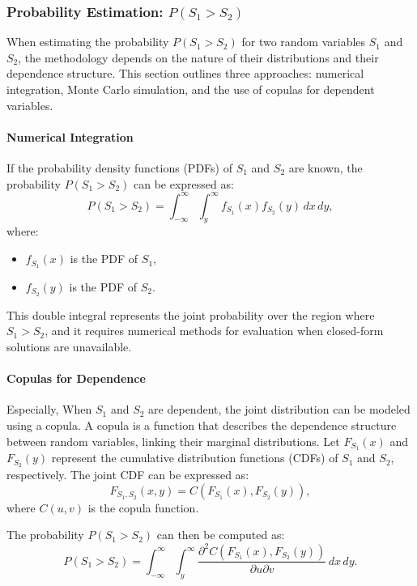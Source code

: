 \subsubsection{Probability Estimation: $P(S_1 > S_2)$}

When estimating the probability $P(S_1 > S_2)$ for two random variables $S_1$ and $S_2$, the methodology depends on the nature of their distributions and their dependence structure. This section outlines three approaches: numerical integration, Monte Carlo simulation, and the use of copulas for dependent variables.

\paragraph{Numerical Integration}

If the probability density functions (PDFs) of $S_1$ and $S_2$ are known, the probability $P(S_1 > S_2)$ can be expressed as:
\begin{equation}
P(S_1 > S_2) = \int_{-\infty}^\infty \int_{y}^\infty f_{S_1}(x) f_{S_2}(y) \, dx \, dy,
\end{equation}
where:
\begin{itemize}
    \item $f_{S_1}(x)$ is the PDF of $S_1$,
    \item $f_{S_2}(y)$ is the PDF of $S_2$.
\end{itemize}

This double integral represents the joint probability over the region where $S_1 > S_2$, and it requires numerical methods for evaluation when closed-form solutions are unavailable.


\paragraph{Copulas for Dependence}

Especially, When $S_1$ and $S_2$ are dependent, the joint distribution can be modeled using a copula. A copula is a function that describes the dependence structure between random variables, linking their marginal distributions. Let $F_{S_1}(x)$ and $F_{S_2}(y)$ represent the cumulative distribution functions (CDFs) of $S_1$ and $S_2$, respectively. The joint CDF can be expressed as:
\begin{equation}
F_{S_1, S_2}(x, y) = C(F_{S_1}(x), F_{S_2}(y)),
\end{equation}
where $C(u, v)$ is the copula function.

The probability $P(S_1 > S_2)$ can then be computed as:
\begin{equation}
P(S_1 > S_2) = \int_{-\infty}^\infty \int_{y}^\infty \frac{\partial^2 C(F_{S_1}(x), F_{S_2}(y))}{\partial u \partial v} \, dx \, dy.
\end{equation}

